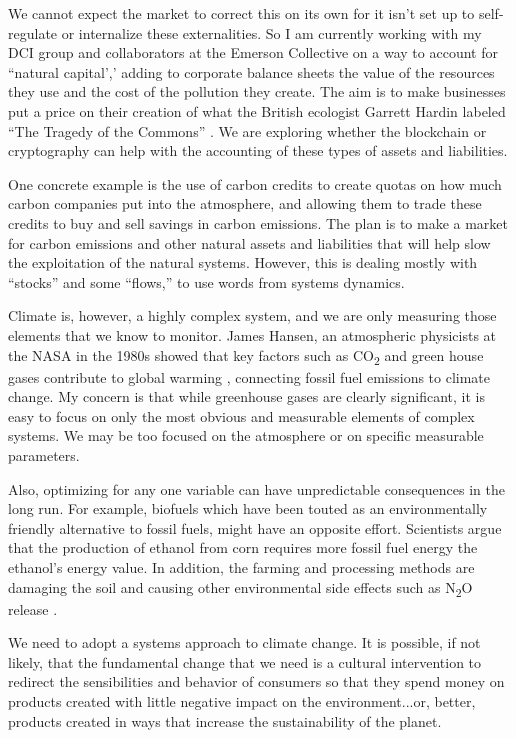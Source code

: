 We cannot expect the market to correct this on its own for it isn't set up to self-regulate or internalize these externalities. So I am currently working with my \ac{DCI} group and collaborators at the Emerson Collective on a way to account for ``natural capital',' adding to corporate balance sheets the value of the resources they use and the cost of the pollution they create. The aim is to make businesses put a price on their creation of what the British ecologist Garrett Hardin labeled ``The Tragedy of the Commons'' \cite{hardin1968tragedy}. We are exploring whether the blockchain or cryptography can help with the accounting of these types of assets and liabilities.

One concrete example is the use of carbon credits to create quotas on how much carbon companies put into the atmosphere, and allowing them to trade these credits to buy and sell savings in carbon emissions. The plan is to make a market for carbon emissions and other natural assets and liabilities that will help slow the exploitation of the natural systems. However, this is dealing mostly with ``stocks'' and some ``flows,'' to use words from systems dynamics.

Climate is, however, a highly complex system, and we are only measuring those elements that we know to monitor. James Hansen, an atmospheric physicists at the \ac{NASA} in the 1980s showed that key factors such as CO\textsubscript{2} and green house gases contribute to global warming \cite{hansen1981climate}, connecting fossil fuel emissions to climate change. My concern is that while greenhouse gases are clearly significant, it is easy to focus on only the most obvious and measurable elements of complex systems. We may be too focused on the atmosphere or on specific measurable parameters. 

Also, optimizing for any one variable can have unpredictable consequences in the long run. For example, biofuels which have been touted as an environmentally friendly alternative to fossil fuels, might have an opposite effort. Scientists argue that the production of ethanol from corn requires more fossil fuel energy \cite{patzek2004thermodynamics} the ethanol's energy value. In addition, the farming and processing methods are damaging the soil and causing other environmental side effects such as N\textsubscript{2}O release \cite{crutzen2007n}.

We need to adopt a systems approach to climate change. It is possible, if not likely, that the fundamental change that we need is a cultural intervention to redirect the sensibilities and behavior of consumers so that they spend money on products created with little negative impact on the environment...or, better, products created in ways that increase the sustainability of the planet.

